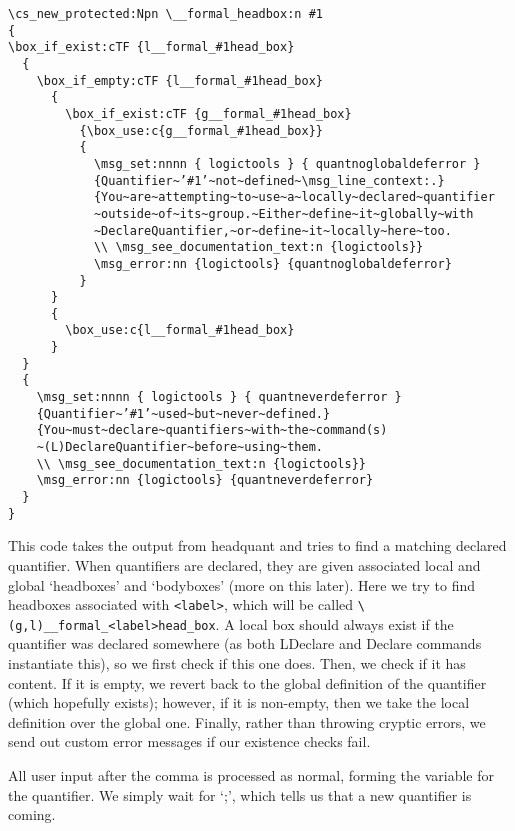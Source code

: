 \documentclass{article}
\begin{document}
\begin{Verbatim}
\cs_new_protected:Npn \__formal_headbox:n #1
{
\box_if_exist:cTF {l__formal_#1head_box}
  {
    \box_if_empty:cTF {l__formal_#1head_box} 
      {
        \box_if_exist:cTF {g__formal_#1head_box}
          {\box_use:c{g__formal_#1head_box}}
          {
            \msg_set:nnnn { logictools } { quantnoglobaldeferror }
            {Quantifier~’#1’~not~defined~\msg_line_context:.}
            {You~are~attempting~to~use~a~locally~declared~quantifier
            ~outside~of~its~group.~Either~define~it~globally~with
            ~DeclareQuantifier,~or~define~it~locally~here~too.
            \\ \msg_see_documentation_text:n {logictools}}
            \msg_error:nn {logictools} {quantnoglobaldeferror}
          }
      } 
      {
        \box_use:c{l__formal_#1head_box}
      }
  }
  {
    \msg_set:nnnn { logictools } { quantneverdeferror }
    {Quantifier~’#1’~used~but~never~defined.}
    {You~must~declare~quantifiers~with~the~command(s)
    ~(L)DeclareQuantifier~before~using~them.
    \\ \msg_see_documentation_text:n {logictools}}
    \msg_error:nn {logictools} {quantneverdeferror}
  }
}
\end{Verbatim}
This code takes the output from headquant and tries to find a matching declared quantifier. When quantifiers are declared, they are given associated local and global `headboxes' and `bodyboxes' (more on this later). Here we try to find headboxes associated with \texttt{<label>}, which will be called \verb|\(g,l)__formal_<label>head_box|. A local box should always exist if the quantifier was declared somewhere (as both LDeclare and Declare commands instantiate this), so we first check if this one does. Then, we check if it has content. If it is empty, we revert back to the global definition of the quantifier (which hopefully exists); however, if it is non-empty, then we take the local definition over the global one. Finally, rather than throwing cryptic errors, we send out custom error messages if our existence checks fail.

All user input after the comma is processed as normal, forming the variable for the quantifier. We simply wait for `;', which tells us that a new quantifier is coming.
\\\mbox{}
\end{document}
